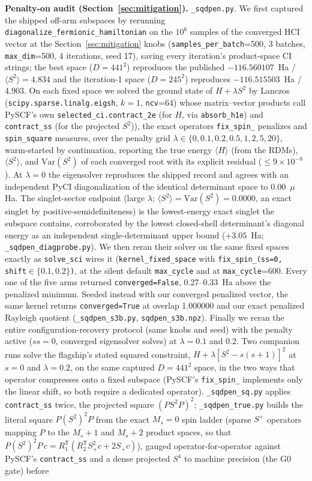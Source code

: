 \documentclass[11pt]{article}
\newcommand{\ssq}{\ensuremath{\langle S^2\rangle}}
\begin{document}
\textbf{Penalty-on audit (Section~\ref{sec:mitigation}).} \texttt{\_sqdpen.py}. We first captured the shipped off-arm subspaces by rerunning \texttt{diagonalize\_fermionic\_hamiltonian} on the $10^6$ samples of the converged HCI vector at the Section~\ref{sec:mitigation} knobs (\texttt{samples\_per\_batch}=500, 3 batches, \texttt{max\_dim}=500, 4 iterations, seed 17), saving every iteration's product-space CI strings; the best space ($D=441^2$) reproduces the published $-116.560107$~Ha / $\ssq=4.834$ and the iteration-1 space ($D=245^2$) reproduces $-116.515503$~Ha / 4.903. On each fixed space we solved the ground state of $H+\lambda S^2$ by Lanczos (\texttt{scipy.sparse.linalg.eigsh}, $k=1$, \texttt{ncv}=64) whose matrix--vector products call PySCF's own \texttt{selected\_ci.contract\_2e} (for $H$, via \texttt{absorb\_h1e}) and \texttt{contract\_ss} (for the projected $S^2$)), the exact operators \texttt{fix\_spin\_} penalizes and \texttt{spin\_square} measures, over the penalty grid $\lambda \in \{0, 0.1, 0.2, 0.5, 1, 2, 5, 20\}$, warm-started by continuation, reporting the true energy $\langle H\rangle$ (from the RDMs), \ssq, and $\mathrm{Var}(S^2)$ of each converged root with its explicit residual ($\leq 9\times10^{-8}$). At $\lambda=0$ the eigensolver reproduces the shipped record and agrees with an independent PyCI diagonalization of the identical determinant space to 0.00~$\mu$Ha. The singlet-sector endpoint (large $\lambda$; $\ssq=\mathrm{Var}(S^2)=0.0000$, an exact singlet by positive-semidefiniteness) is the lowest-energy exact singlet the subspace contains, corroborated by the lowest closed-shell determinant's diagonal energy as an independent single-determinant upper bound ($+3.05$~Ha; \texttt{\_sqdpen\_diagprobe.py}). We then reran their solver on the same fixed spaces exactly as \texttt{solve\_sci} wires it (\texttt{kernel\_fixed\_space} with \texttt{fix\_spin\_(ss=0, shift}$\in\{0.1,0.2\}$\texttt{)}, at the silent default \texttt{max\_cycle} and at \texttt{max\_cycle}=600. Every one of the five arms returned \texttt{converged=False}, 0.27--0.33~Ha above the penalized minimum. Seeded instead with our converged penalized vector, the same kernel returns \texttt{converged=True} at overlap 1.000000 and our exact penalized Rayleigh quotient (\texttt{\_sqdpen\_s3b.py}, \texttt{sqdpen\_s3b.npz}). Finally we reran the entire configuration-recovery protocol (same knobs and seed) with the penalty active ($ss=0$, converged eigensolver solves) at $\lambda=0.1$ and 0.2. Two companion runs solve the flagship's stated squared constraint, $H+\lambda[S^2-s(s+1)]^2$ at $s=0$ and $\lambda=0.2$, on the same captured $D=441^2$ space, in the two ways that operator compresses onto a fixed subspace (PySCF's \texttt{fix\_spin\_} implements only the linear shift, so both require a dedicated operator). \texttt{\_sqdpen\_sq.py} applies \texttt{contract\_ss} twice, the projected square $(PS^2P)^2$; \texttt{\_sqdpen\_true.py} builds the literal square $P(S^2)^2P$ from the exact $M_s=0$ spin ladder (sparse $S^+$ operators mapping $P$ to the $M_s{+}1$ and $M_s{+}2$ product spaces, so that $P(S^2)^2P\,c = R_1^{\mathsf T}(R_2^{\mathsf T}S_+^2 c + 2 S_+ c)$), gauged operator-for-operator against PySCF's \texttt{contract\_ss} and a dense projected $S^4$ to machine precision (the G0 gate) before 
\end{document}
